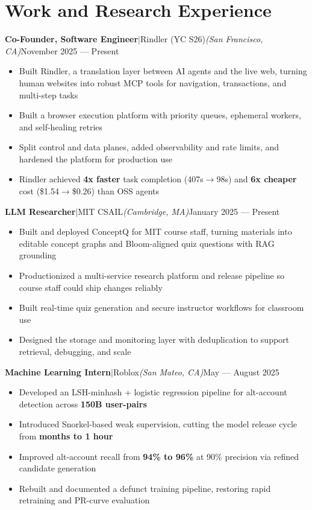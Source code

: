 \documentclass[letterpaper,10pt]{article}
\newcommand{\entry}[4]{%
  \vspace{6pt}%
  \noindent\textbf{#1}\enspace$|$\enspace#2\enspace\textit{(#3)}\hfill#4%
  \vspace{1pt}%
}
\newcommand{\bulletlist}{\begin{itemize}[leftmargin=1.2em, rightmargin=3.7em, labelsep=0.45em, itemsep=0.5pt, topsep=0pt, parsep=0pt, partopsep=0pt]}
\newcommand{\bulletlistend}{\end{itemize}}
\begin{document}
\section{Work and Research Experience}

\entry{Co-Founder, Software Engineer}{Rindler (YC S26)}{San Francisco, CA}{November 2025 --- Present}
\bulletlist
  \item Built Rindler, a translation layer between AI agents and the live web, turning human websites into robust MCP tools for navigation, transactions, and multi-step tasks
  \item Built a browser execution platform with priority queues, ephemeral workers, and self-healing retries
  \item Split control and data planes, added observability and rate limits, and hardened the platform for production use
  \item Rindler achieved \textbf{4x faster} task completion (407s$\to$98s) and \textbf{6x cheaper} cost (\$1.54$\to$\$0.26) than OSS agents
\bulletlistend

\entry{LLM Researcher}{MIT CSAIL}{Cambridge, MA}{January 2025 --- Present}
\bulletlist
  \item Built and deployed ConceptQ for MIT course staff, turning materials into editable concept graphs and Bloom-aligned quiz questions with RAG grounding
  \item Productionized a multi-service research platform and release pipeline so course staff could ship changes reliably
  \item Built real-time quiz generation and secure instructor workflows for classroom use
  \item Designed the storage and monitoring layer with deduplication to support retrieval, debugging, and scale
\bulletlistend

\entry{Machine Learning Intern}{Roblox}{San Mateo, CA}{May --- August 2025}
\bulletlist
  \item Developed an LSH-minhash + logistic regression pipeline for alt-account detection across \textbf{150B user-pairs}
  \item Introduced Snorkel-based weak supervision, cutting the model release cycle from \textbf{months to 1 hour}
  \item Improved alt-account recall from \textbf{94\% to 96\%} at 90\% precision via refined candidate generation
  \item Rebuilt and documented a defunct training pipeline, restoring rapid retraining and PR-curve evaluation
\bulletlistend
\end{document}
